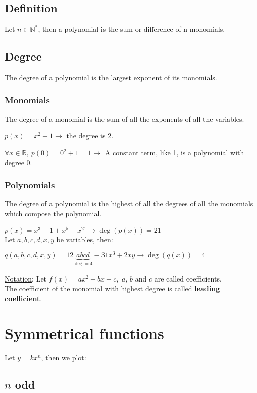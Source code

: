 \documentclass{article}
\newcommand{\figbox}[1]{ 
    \begin{figure*}[ht!]        
        \begin{center}            
            \fbox{#1}        
        \end{center}    
    \end{figure*}
}
\begin{document}
\subsection{Definition}
Let $n \in \mathbb{N^*}$, then a polynomial is the sum or difference of n-monomials. 

\subsection{Degree}
The degree of a polynomial is the largest exponent of its monomials.

\subsubsection{Monomials}
The degree of a monomial is the sum of all the exponents of all the variables.

$p(x)=x^2+1 \rightarrow$ the degree is 2.

$\forall x \in \mathbb{R},\ p(0)=0^2+1=1 \rightarrow$ A constant term, like 1, is a polynomial with degree 0.

\subsubsection{Polynomials}
The degree of a polynomial is the highest of all the degrees of all the
monomials which compose the polynomial.

$p(x)=x^3+1+x^5+x^21 \rightarrow \deg(p(x))=21$\\

Let $a,b,c,d,x,y$ be variables, then:

$q(a,b,c,d,x,y)=12 \underbrace{abcd}_{\deg=4} - 31x^3+2xy \rightarrow \deg(q(x))=4$ 

\underline{Notation}: Let $f(x)=ax^2+bx+c$,\ $a$, $b$ and $c$ are called coefficients.\\
The coefficient of the monomial with highest degree is called \textbf{leading coefficient}.

\section{Symmetrical functions}
Let $y = kx^n$, then we plot:
\subsection{$n$ odd}
\figbox{$f(-x)=-f(x), \quad \forall x \in \mathbb{R}$}
\end{document}
